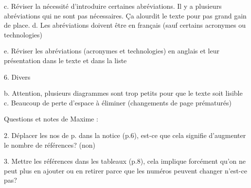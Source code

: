 c. Réviser la nécessité d’introduire certaines abréviations. Il y a plusieurs abréviations qui ne sont pas nécessaires. Ça alourdit le texte pour pas grand gain de place.
d. Les abréviations doivent être en français (sauf certains acronymes ou technologies)

e. Réviser les abréviations (acronymes et technologies) en anglais et leur présentation dans le texte et dans la liste

6. Divers

b. Attention, plusieurs diagrammes sont trop petits pour que le texte soit lisible
c. Beaucoup de perte d'espace à éliminer (changements de page prématurés)


Questions et notes de Maxime :


2. Déplacer les nos de p. dans la notice (p.6), est-ce que cela signifie d'augmenter le nombre de références? (non)

3. Mettre les références dans les tableaux (p.8), cela implique forcément qu'on ne peut plus en ajouter ou en retirer parce que les numéros peuvent changer n'est-ce pas?


